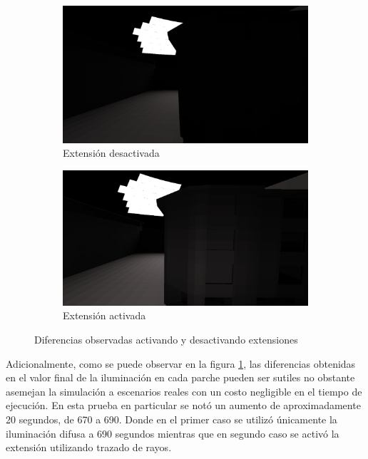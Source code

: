 \begin{figure}[htbp]
	\centering
	\begin{subfigure}{0.47\textwidth}
		\includegraphics[width=1\linewidth]{assets/streete}
		\caption{Extensión desactivada}
	\end{subfigure}
	\begin{subfigure}{0.47\textwidth}
		\includegraphics[width=1\linewidth]{assets/streets}
		\caption{Extensión activada}
	\end{subfigure}
	\caption{Diferencias observadas activando y desactivando extensiones}
	\label{img:difspecstreet}
\end{figure}

Adicionalmente, como se puede observar en la figura \ref{img:difspecstreet}, las diferencias obtenidas en el valor final de la iluminación en cada parche pueden ser sutiles no obstante asemejan la simulación a escenarios reales con un costo negligible en el tiempo de ejecución. En esta prueba en particular se notó un aumento de aproximadamente 20 segundos, de 670 a 690. Donde en el primer caso se utilizó únicamente la iluminación difusa a 690 segundos mientras que en segundo caso se activó la extensión utilizando trazado de rayos.

